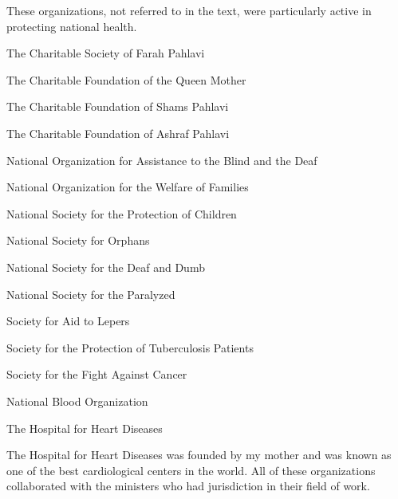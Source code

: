 These organizations, not referred to in the text, were particularly active in protecting national health. 

The Charitable Society of Farah Pahlavi 

The Charitable Foundation of the Queen Mother 

The Charitable Foundation of Shams Pahlavi 

The Charitable Foundation of Ashraf Pahlavi 

National Organization for Assistance to the Blind and the Deaf 

National Organization for the Welfare of Families 

National Society for the Protection of Children 

National Society for Orphans 

National Society for the Deaf and Dumb 

National Society for the Paralyzed 

Society for Aid to Lepers 

Society for the Protection of Tuberculosis Patients 

Society for the Fight Against Cancer 

National Blood Organization 

The Hospital for Heart Diseases 

The Hospital for Heart Diseases was founded by my mother and was known as one of the best cardiological centers in the world. All of these organizations collaborated with the ministers who had jurisdiction in their field of work. 


